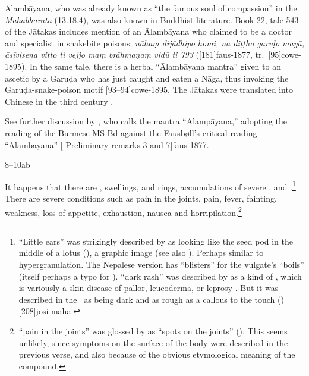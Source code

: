 \begin{translation}
{Ālambāyana, who was already known as “the famous soul of compassion”
in the \emph{Mahābhārata} (13.18.4), was also known in Buddhist
literature. Book 22, tale 543 of the Jātakas includes mention of
an Ālambāyana who claimed to be a doctor and specialist in
snakebite poisons: \emph{nāhaṃ dijādhipo homi, na diṭṭho garuḷo
mayā, āsīvisena vitto ti vejjo maṃ brāhmaṇaṃ vidū ti 793}
([181]{faus-1877}, tr.\  [95]{cowe-1895}).
In the same tale, there is a herbal “Ālambāyana mantra” given to
an ascetic by a Garuḍa who has just caught and eaten a Nāga, thus
invoking the Garuḍa-snake-poison motif
[93--94]{cowe-1895}.  The Jātakas were translated
into Chinese in the third century \CE.
    
    See further discussion by \citet[33--34]{slou-2016}, who calls
    the mantra “Alampāyana,” adopting the reading of the Burmese MS
    Bd against the Fausbøll's critical reading  “Ālambāyana” 
    [ Preliminary remarks 3 and 7]{faus-1877}.}
    
\item[8--10ab]

It happens that there are , swellings,
 and rings, accumulations of
severe , 
and .\footnote{\label{karṇika}“Little ears” was strikingly described
    by  as looking like the seed pod in the middle of
    a lotus (), a graphic image (see also
    ).  Perhaps similar to hypergranulation. 
    The Nepalese version has  “blisters” for the
    vulgate's  “boils” (itself perhaps a typo for
    ).   “dark rash” was described by
     as a kind of , which is
    variously a skin disease of pallor, leucoderma, or leprosy
    \citep{emme-1984}. But it was described in the \CS\ as being dark
    and as rough as a callous to the touch ()
    [208]{josi-maha}.}  There are severe conditions such
    as pain in the joints, pain, fever, fainting, weakness, loss of
    appetite, exhaustion, nausea and
    horripilation.\footnote{ “pain in the joints” was
        glossed by  as “spots on the joints”
        ().  This seems unlikely, since symptoms on
        the surface of the body were described in the previous verse, and
        also because of the obvious etymological meaning of the
        compound.}
        


\end{translation}
